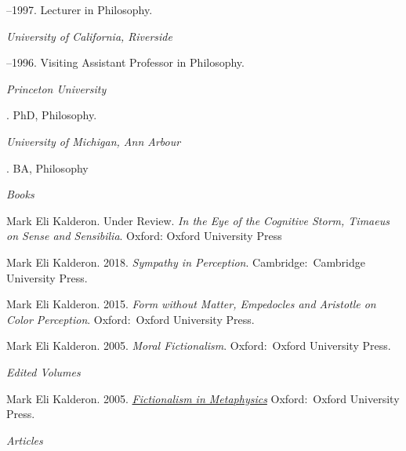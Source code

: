 \documentclass[11pt]{article}
\begin{document}
--1997. Lecturer in Philosophy.

\medskip
\noindent\emph{University of California, Riverside \vspace{0.01in}}

--1996. Visiting Assistant Professor in Philosophy.


\bigskip



\noindent\emph{Princeton University \vspace{0.01in}}

. PhD, Philosophy.

\medskip
\noindent\emph{University of Michigan, Ann Arbour\vspace{0.02in}}

. BA, Philosophy

\bigskip
 
\medskip
\noindent\emph{Books \vspace{0.01in}}

\ind Mark Eli Kalderon. Under Review.
\emph{In the Eye of the Cognitive Storm, Timaeus on Sense and Sensibilia}. Oxford: Oxford University Press %

\ind Mark Eli Kalderon. 2018.
\emph{Sympathy in Perception}. Cambridge:~Cambridge University Press. %

\ind Mark Eli Kalderon. 2015. \emph{Form without Matter, Empedocles and Aristotle on Color Perception}. Oxford:~Oxford University Press. %

\ind Mark Eli Kalderon. 2005. \emph{Moral Fictionalism}. Oxford:~Oxford University Press. %

\medskip
\noindent\emph{Edited Volumes \vspace{0.01in}}

\ind Mark Eli Kalderon. 2005. \emph{\href{http://ukcatalogue.oup.com/product/9780199282180.do}{Fictionalism in Metaphysics}} Oxford:~Oxford University Press. %
 
\normalsize

\bigskip
\noindent\emph{Articles \vspace{0.05in}}
 
\end{document}

